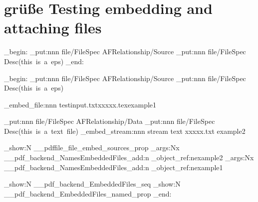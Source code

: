 \documentclass{article}
\begin{document}
\section{grüße Testing embedding and attaching files}
\ExplSyntaxOn
\group_begin:
\pdfdict_put:nnn  {file/FileSpec} {AFRelationship}{/Source}
\pdfdict_put:nnn  {file/FileSpec} {Desc}{(this~is~a~eps)}
\group_end:

\group_begin:
\pdfdict_put:nnn  {file/FileSpec} {AFRelationship}{/Source}
\pdfdict_put:nnn  {file/FileSpec} {Desc}{(this~is~a~eps)}

\pdffile_embed_file:nnn {testinput.txt}{xxxxx.tex}{example1}

\pdfdict_put:nnn  {file/FileSpec} {AFRelationship}{/Data}
\pdfdict_put:nnn  {file/FileSpec} {Desc}{(this~is~a~text~file)}
\pdffile_embed_stream:nnn {stream text} {xxxxx.txt} {example2}

\prop_show:N \g__pdffile_file_embed_sources_prop
\exp_args:Nx
          \__pdf_backend_NamesEmbeddedFiles_add:n {\pdf_object_ref:n{example2}} 
\exp_args:Nx
          \__pdf_backend_NamesEmbeddedFiles_add:n {\pdf_object_ref:n{example1}} 

\seq_show:N \g__pdf_backend_EmbeddedFiles_seq
\prop_show:N \g__pdf_backend_EmbeddedFiles_named_prop
\group_end:
\end{document}
